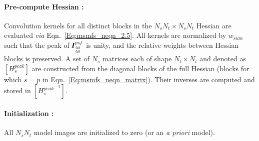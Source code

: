 \documentclass[structabstract]{stylefiles/aa}
\begin{document}
\noindent\paragraph{\bf Pre-compute Hessian : }
Convolution kernels for all distinct blocks in the $N_s N_t \times N_s N_t$ Hessian 
are evaluated {\it via} Eqn.~\ref{Eq:msmfs_neqn_2.5}. 
All kernels are normalized by $w_{sum}$ such that the peak of $\vec{I}^{psf}_{{0,0}\atop{0,0}}$
is unity, and the relative weights between Hessian blocks is preserved. 
A set of $N_s$ matrices each of shape $N_t\times N_t$ and denoted as $[H^{peak}_s]$
are constructed from the diagonal blocks of the full Hessian (blocks for which $s=p$ 
in Eqn.~\ref{Eq:msmfs_neqn_matrix}).
Their inverses are computed and stored in $[{H^{peak}_s}^{-1}]$.


\noindent\paragraph{\bf Initialization :} 
All $N_sN_t$ model images are initialized to zero (or an {\it a priori} model).
\end{document}

